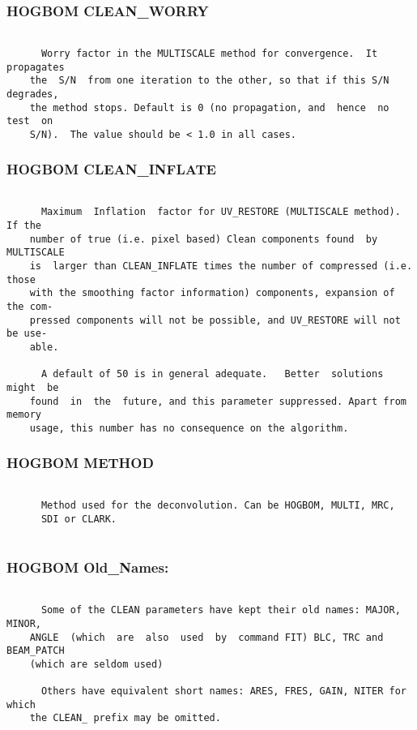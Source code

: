 \subsubsection{HOGBOM CLEAN\_WORRY}
\begin{verbatim}

      Worry factor in the MULTISCALE method for convergence.  It  propagates
    the  S/N  from one iteration to the other, so that if this S/N degrades,
    the method stops. Default is 0 (no propagation, and  hence  no  test  on
    S/N).  The value should be < 1.0 in all cases.

\end{verbatim}
\subsubsection{HOGBOM CLEAN\_INFLATE}
\begin{verbatim}

      Maximum  Inflation  factor for UV_RESTORE (MULTISCALE method).  If the
    number of true (i.e. pixel based) Clean components found  by  MULTISCALE
    is  larger than CLEAN_INFLATE times the number of compressed (i.e. those
    with the smoothing factor information) components, expansion of the com-
    pressed components will not be possible, and UV_RESTORE will not be use-
    able.

      A default of 50 is in general adequate.   Better  solutions  might  be
    found  in  the  future, and this parameter suppressed. Apart from memory
    usage, this number has no consequence on the algorithm.

\end{verbatim}
\subsubsection{HOGBOM METHOD}
\begin{verbatim}

      Method used for the deconvolution. Can be HOGBOM, MULTI, MRC,
      SDI or CLARK.


\end{verbatim}
\subsubsection{HOGBOM Old\_Names:}
\begin{verbatim}

      Some of the CLEAN parameters have kept their old names: MAJOR,  MINOR,
    ANGLE  (which  are  also  used  by  command FIT) BLC, TRC and BEAM_PATCH
    (which are seldom used)

      Others have equivalent short names: ARES, FRES, GAIN, NITER for  which
    the CLEAN_ prefix may be omitted.

\end{verbatim}
